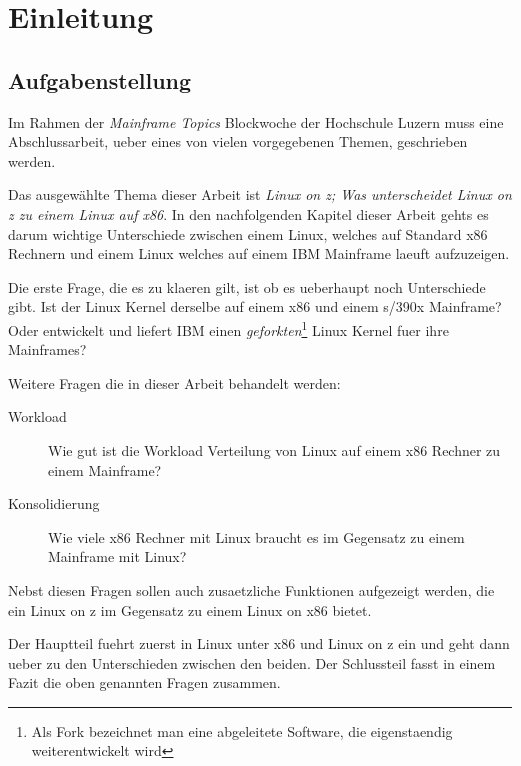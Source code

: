 \chapter{Einleitung}
\label{cha:Einleitung}

\section{Aufgabenstellung}

Im Rahmen der \textit{Mainframe Topics} Blockwoche der Hochschule Luzern muss eine Abschlussarbeit,
ueber eines von vielen vorgegebenen Themen, geschrieben werden.

Das ausgewählte Thema dieser Arbeit ist \textit{Linux on z; Was unterscheidet Linux on z zu einem Linux auf x86}.
In den nachfolgenden Kapitel dieser Arbeit gehts es darum wichtige Unterschiede zwischen einem Linux, welches auf Standard x86 Rechnern und einem Linux welches auf einem IBM Mainframe laeuft aufzuzeigen.

Die erste Frage, die es zu klaeren gilt, ist ob es ueberhaupt noch Unterschiede gibt. Ist der Linux Kernel derselbe auf einem x86 und einem s/390x Mainframe? Oder entwickelt und liefert IBM einen \textit{geforkten}\footnote{Als Fork bezeichnet man eine abgeleitete Software, die eigenstaendig weiterentwickelt wird} Linux Kernel fuer ihre Mainframes?

Weitere Fragen die in dieser Arbeit behandelt werden:
\begin{description}
    \item[Workload]{Wie gut ist die Workload Verteilung von Linux auf einem x86 Rechner zu einem Mainframe?}
    \item[Konsolidierung]{Wie viele x86 Rechner mit Linux braucht es im Gegensatz zu einem Mainframe mit Linux?}
\end{description}

Nebst diesen Fragen sollen auch zusaetzliche Funktionen aufgezeigt werden, die ein Linux on z im Gegensatz zu einem Linux on x86 bietet.

Der Hauptteil fuehrt zuerst in Linux unter x86 und Linux on z ein und geht dann ueber zu den Unterschieden zwischen den beiden.
Der Schlussteil fasst in einem Fazit die oben genannten Fragen zusammen.
